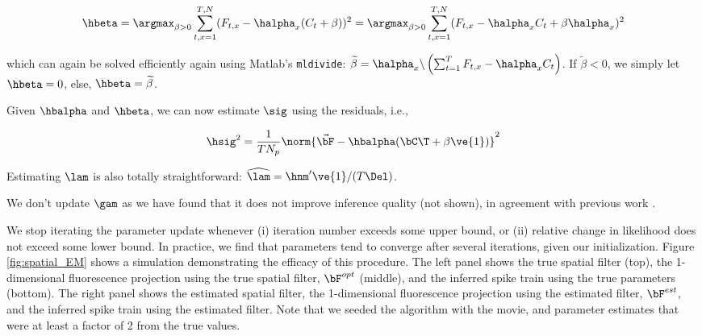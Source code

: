\begin{align}
\hbeta 
= \argmax_{\beta>0} \sum_{t,x=1}^{T,N} (F_{t,x} - \halpha_x(C_t + \beta))^2 
= \argmax_{\beta>0} \sum_{t,x=1}^{T,N} (F_{t,x} - \halpha_x C_t + \beta \halpha_x)^2 
\end{align}

\noindent which can again be solved efficiently again using Matlab's \texttt{mldivide}: $\widetilde{\beta}= \halpha_x \backslash \left(\sum_{t=1}^T F_{t,x} - \halpha_x C_t\right)$.  If $\widetilde{\beta}<0$, we simply let $\hbeta=0$, else, $\hbeta=\widetilde{\beta}$.

Given $\hbalpha$ and $\hbeta$, we can now estimate $\sig$ using the residuals, i.e.,

\begin{align}
	\hsig^2 = \frac{1}{T N_p}\norm{\vec{\bF} - \hbalpha(\bC\T + \beta \ve{1})}^2
\end{align}

Estimating $\lam$ is also totally straightforward: $\widehat{\lam} = \hnm' \ve{1}/ (T \Del)$. 
% 

We don't update $\gam$ as we have found that it does not improve inference quality (not shown), in agreement with previous work \cite{YaksiFriedrich07}.


We stop iterating the parameter update whenever (i) iteration number exceeds some upper bound, or (ii) relative change in likelihood does not exceed some lower bound.  In practice, we find that parameters tend to converge after several iterations, given our initialization.  Figure \ref{fig:spatial_EM} shows a simulation demonstrating the efficacy of this procedure.  The left panel shows the true spatial filter (top), the 1-dimensional fluorescence projection using the true spatial filter, $\bF^{opt}$ (middle), and the inferred spike train using the true parameters (bottom).  The right panel shows the estimated spatial filter, the 1-dimensional fluorescence projection using the estimated filter, $\bF^{est}$, and the inferred spike train using the estimated filter.  Note that we seeded the algorithm with the movie, and parameter estimates that were at least a factor of 2 from the true values.

